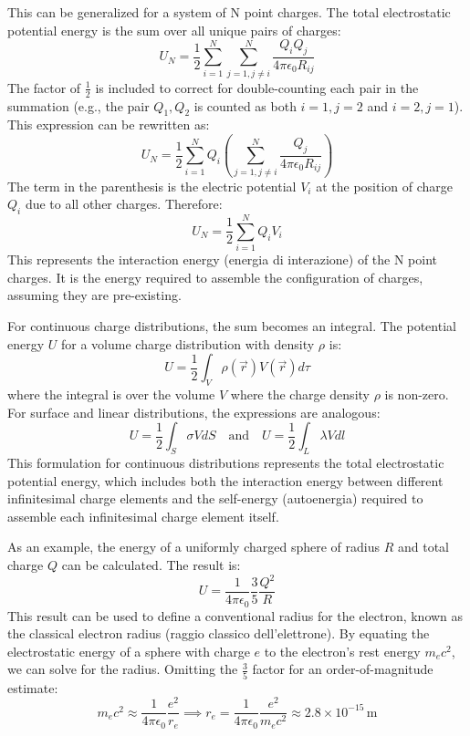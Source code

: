 This can be generalized for a system of N point charges. The total electrostatic potential energy is the sum over all unique pairs of charges:
\[ U_N = \frac{1}{2} \sum_{i=1}^{N} \sum_{j=1, j \neq i}^{N} \frac{Q_i Q_j}{4\pi\epsilon_0 R_{ij}} \]
The factor of \(\frac{1}{2}\) is included to correct for double-counting each pair in the summation (e.g., the pair \(Q_1, Q_2\) is counted as both \(i=1, j=2\) and \(i=2, j=1\)).
This expression can be rewritten as:
\[ U_N = \frac{1}{2} \sum_{i=1}^{N} Q_i \left( \sum_{j=1, j \neq i}^{N} \frac{Q_j}{4\pi\epsilon_0 R_{ij}} \right) \]
The term in the parenthesis is the electric potential \(V_i\) at the position of charge \(Q_i\) due to all other charges. Therefore:
\[ U_N = \frac{1}{2} \sum_{i=1}^{N} Q_i V_i \]
This represents the interaction energy (energia di interazione) of the N point charges. It is the energy required to assemble the configuration of charges, assuming they are pre-existing.

For continuous charge distributions, the sum becomes an integral. The potential energy \(U\) for a volume charge distribution with density \(\rho\) is:
\[ U = \frac{1}{2} \int_V \rho(\vec{r}) V(\vec{r}) d\tau \]
where the integral is over the volume \(V\) where the charge density \(\rho\) is non-zero.
For surface and linear distributions, the expressions are analogous:
\[ U = \frac{1}{2} \int_S \sigma V dS \quad \text{and} \quad U = \frac{1}{2} \int_L \lambda V dl \]
This formulation for continuous distributions represents the total electrostatic potential energy, which includes both the interaction energy between different infinitesimal charge elements and the self-energy (autoenergia) required to assemble each infinitesimal charge element itself.

As an example, the energy of a uniformly charged sphere of radius \(R\) and total charge \(Q\) can be calculated. The result is:
\[ U = \frac{1}{4\pi\epsilon_0} \frac{3}{5} \frac{Q^2}{R} \]
This result can be used to define a conventional radius for the electron, known as the classical electron radius (raggio classico dell'elettrone). By equating the electrostatic energy of a sphere with charge \(e\) to the electron's rest energy \(m_e c^2\), we can solve for the radius. Omitting the \(\frac{3}{5}\) factor for an order-of-magnitude estimate:
\[ m_e c^2 \approx \frac{1}{4\pi\epsilon_0} \frac{e^2}{r_e} \implies r_e = \frac{1}{4\pi\epsilon_0} \frac{e^2}{m_e c^2} \approx 2.8 \times 10^{-15} \, \text{m} \]

